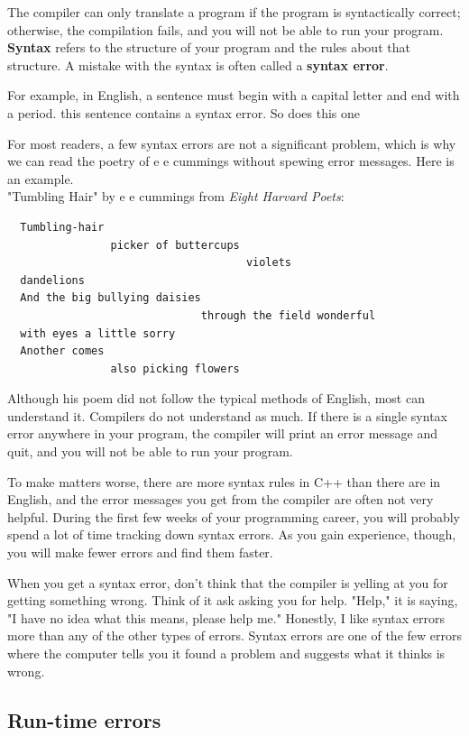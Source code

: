 The compiler can only translate a program if the program is
syntactically correct; otherwise, the compilation fails, and
you will not be able to run your program.  {\bf Syntax}
refers to the structure of your program and the rules about
that structure. A mistake with the syntax is often called a {\bf syntax error}.


For example, in English, a sentence must begin with a capital
letter and end with a period.  this sentence contains a syntax
error.  So does this one

For most readers, a few syntax errors are not a significant problem, which is why we can read the poetry of e e cummings
without spewing error messages. Here is an example.\
\\
\vspace{0.1in}
"Tumbling Hair" by e e cummings from {\em Eight Harvard Poets}:
\begin{verbatim}
  Tumbling-hair
                picker of buttercups
                                     violets
  dandelions
  And the big bullying daisies
                              through the field wonderful
  with eyes a little sorry
  Another comes
                also picking flowers
\end{verbatim}

Although his poem did not follow the typical
methods of English, most can understand it.
Compilers do not understand as much.  If there is a single syntax
error anywhere in your program, the compiler will print an
error message and quit, and you will not be able to run
your program.

To make matters worse, there are more syntax rules in C++
than there are in English, and the error messages you get from
the compiler are often not very helpful.  During the first
few weeks of your programming career, you will probably
spend a lot of time tracking down syntax errors.  As you
gain experience, though, you will make fewer errors and find
them faster.

When you get a syntax error, don't think that the compiler is yelling at you for getting something wrong. Think of it ask asking you for help. "Help," it is saying, "I have no idea what this means, please help me." Honestly, I like syntax errors more than any of the other types of errors. Syntax errors are one of the few errors where the computer tells you it found a problem and suggests what it thinks is wrong. 
\subsection{Run-time errors}
\label{run-time}

